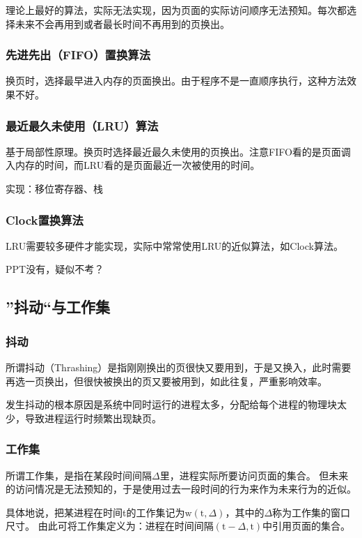 \documentclass[12pt, a4paper, oneside]{ctexart}
\begin{document}
理论上最好的算法，实际无法实现，因为页面的实际访问顺序无法预知。每次都选择未来不会再用到或者最长时间不再用到的页换出。

\subsubsection{先进先出（FIFO）置换算法}

换页时，选择最早进入内存的页面换出。由于程序不是一直顺序执行，这种方法效果不好。

\subsubsection{最近最久未使用（LRU）算法}

基于局部性原理。换页时选择最近最久未使用的页换出。注意FIFO看的是页面调入内存的时间，而LRU看的是页面最近一次被使用的时间。

实现：移位寄存器、栈

\subsubsection{Clock置换算法}

LRU需要较多硬件才能实现，实际中常常使用LRU的近似算法，如Clock算法。

PPT没有，疑似不考？

\subsection{”抖动“与工作集}

\subsubsection{抖动}

所谓抖动（Thrashing）是指刚刚换出的页很快又要用到，于是又换入，此时需要再选一页换出，但很快被换出的页又要被用到，如此往复，严重影响效率。

发生抖动的根本原因是系统中同时运行的进程太多，分配给每个进程的物理块太少，导致进程运行时频繁出现缺页。

\subsubsection{工作集}

所谓工作集，是指在某段时间间隔$\Delta$里，进程实际所要访问页面的集合。
但未来的访问情况是无法预知的，于是使用过去一段时间的行为来作为未来行为的近似。

具体地说，把某进程在时间t的工作集记为$\text{w}(\text{t}, \Delta)$，其中的$\Delta$称为工作集的窗口尺寸。
由此可将工作集定义为：进程在时间间隔$(\text{t}-\Delta,\text{t})$中引用页面的集合。
\end{document}
